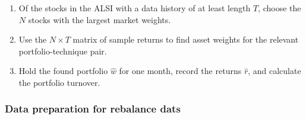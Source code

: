 \documentclass[
]{article}
\begin{document}
\begin{enumerate}
\def\labelenumi{\arabic{enumi}.}
\item
  Of the stocks in the ALSI with a data history of at least length \(T\), choose the \(N\) stocks with the
  largest market weights.
\item
  Use the \(N \times T\) matrix of sample returns to find asset weights for the relevant
  portfolio-technique pair.
\item
  Hold the found portfolio \(\hat{w}\) for one month, record the returns \(\hat{r}\), and calculate the
  portfolio turnover.
\end{enumerate}

\hypertarget{data-preparation-for-rebalance-dats}{%
\subsubsection{Data preparation for rebalance dats}\label{data-preparation-for-rebalance-dats}}
\end{document}
